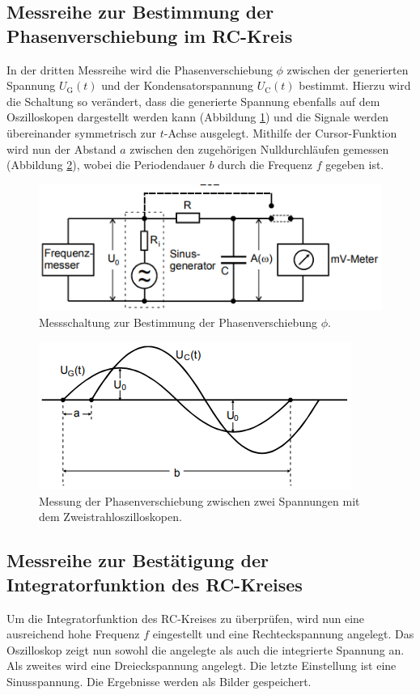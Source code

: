 \subsection{Messreihe zur Bestimmung der Phasenverschiebung im RC-Kreis}
In der dritten Messreihe wird die Phasenverschiebung $\phi$ zwischen der generierten 
Spannung $U_\text{G}(t)$ und der Kondensatorspannung $U_\text{C}(t)$ bestimmt.
Hierzu wird die Schaltung so verändert, dass die generierte Spannung ebenfalls auf 
dem Oszilloskopen dargestellt werden kann (Abbildung \ref{fig:v353_3}) und die Signale 
werden übereinander 
symmetrisch zur $t$-Achse ausgelegt. Mithilfe der Cursor-Funktion wird nun der Abstand
$a$ zwischen den zugehörigen Nulldurchläufen gemessen (Abbildung \ref{fig:phi}), wobei
die Periodendauer $b$ durch die Frequenz $f$ gegeben ist.
\begin{figure}[H]
  \centering
  \includegraphics{V353_2.png}
  \caption{Messschaltung zur Bestimmung der Phasenverschiebung $\phi$. \cite[S. 7]{kent}}
  \label{fig:v353_3}
\end{figure}
\begin{figure}
  \centering
  \includegraphics{phi.png}
  \caption{Messung der Phasenverschiebung zwischen zwei Spannungen mit dem
Zweistrahloszilloskopen. \cite[S. 7]{kent}}
  \label{fig:phi}
\end{figure}

\subsection{Messreihe zur Bestätigung der Integratorfunktion des RC-Kreises}
Um die Integratorfunktion des RC-Kreises zu überprüfen, wird nun eine ausreichend hohe
Frequenz $f$ eingestellt und eine Rechteckspannung angelegt. Das Oszilloskop 
zeigt nun sowohl die angelegte als auch die integrierte Spannung an. Als zweites wird eine
Dreieckspannung angelegt. Die letzte Einstellung ist eine Sinusspannung. Die Ergebnisse
werden als Bilder gespeichert.